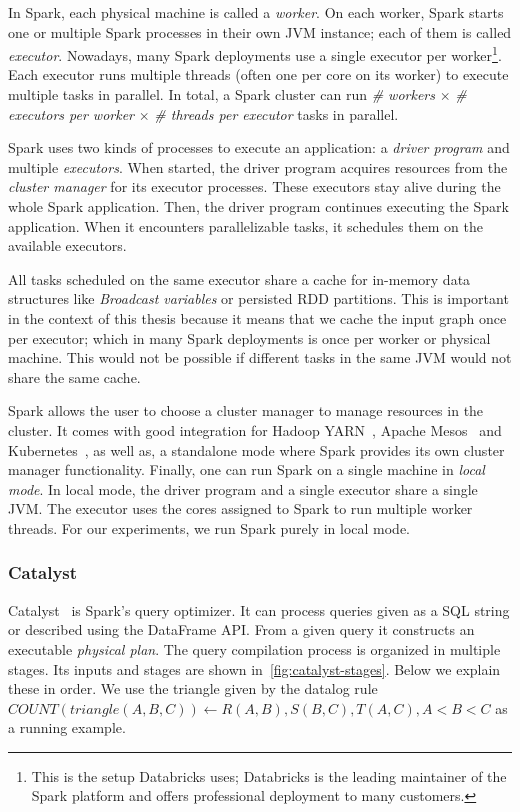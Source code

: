 In Spark, each physical machine is called a \textit{worker}.
On each worker, Spark starts one or multiple Spark processes in their own JVM instance; each of them is called \textit{executor}.
Nowadays, many Spark deployments use a single executor per worker\footnote{This is the setup Databricks uses; Databricks is the leading
maintainer of the Spark platform and offers professional deployment to many customers.}.
Each executor runs multiple threads (often one per core on its worker) to execute multiple tasks in parallel.
In total, a Spark cluster can run \textit{\# workers} $\times$ \textit{\# executors per worker} $\times$ \textit{\# threads per executor} tasks
in parallel.

Spark uses two kinds of processes to execute an application: a \textit{driver program} and multiple \textit{executors}.
When started, the driver program acquires resources from the \textit{cluster manager} for its executor processes.
These executors stay alive during the whole Spark application.
Then, the driver program continues executing the Spark application.
When it encounters parallelizable tasks, it schedules them on the available executors.

All tasks scheduled on the same executor share a cache for in-memory data structures like \textit{Broadcast variables} or persisted RDD
partitions.
This is important in the context of this thesis because it means that we cache the input graph once per executor;
which in many Spark deployments is once per worker or physical machine.
This would not be possible if different tasks in the same JVM would not share the same cache.

Spark allows the user to choose a cluster manager to manage resources in the cluster.
It comes with good integration for Hadoop YARN~\cite{yarn}, Apache Mesos~\cite{mesos} and Kubernetes~\cite{kubernetes}, as well as,
a standalone mode where Spark provides its own cluster manager functionality.
Finally, one can run Spark on a single machine in \textit{local mode}.
In local mode, the driver program and a single executor share a single JVM.
The executor uses the cores assigned to Spark to run multiple worker threads.
For our experiments, we run Spark purely in local mode.

\subsubsection{Catalyst} \label{subsubsec:catalyst}
Catalyst~\cite{spark-sql} is Spark's query optimizer.
It can process queries given as a SQL string or described using the DataFrame API.
From a given query it constructs an executable \textit{physical plan}.
The query compilation process is organized in multiple stages.
Its inputs and stages are shown in~\cref{fig:catalyst-stages}.
Below we explain these in order.
We use the triangle given by the datalog rule $COUNT(triangle(A, B, C)) \leftarrow R(A, B), S(B, C), T(A, C), A < B < C $ as
a running example.

